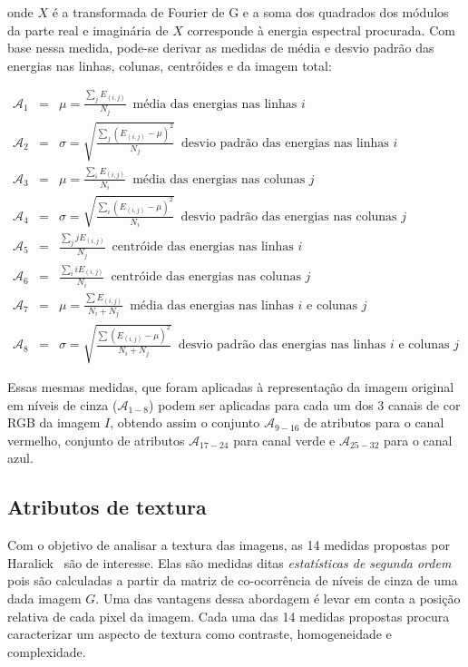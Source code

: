 \noindent onde $X$ é a transformada de Fourier de G e a soma dos quadrados dos
módulos da parte real e imaginária de $X$ corresponde à energia espectral
procurada. Com base nessa medida, pode-se derivar as medidas de média e desvio
padrão das energias nas linhas, colunas, centróides e da imagem total:

\begin{eqnarray}
  \mathcal{A}_1 &=& \mu = \frac{\sum_j E_{(i,j)}}{N_j} \, \, \, \text{média das energias
    nas linhas $i$} \\
  \mathcal{A}_2 &=& \sigma = \sqrt{\frac{\sum_j (E_{(i,j)} - \mu)^2}{N_j}} \, \, \,
  \text{desvio padrão das energias nas linhas $i$} \\
  \mathcal{A}_3 &=& \mu = \frac{\sum_i E_{(i,j)}}{N_i} \, \, \, \text{média das energias
    nas colunas $j$} \\
  \mathcal{A}_4 &=& \sigma = \sqrt{\frac{\sum_i (E_{(i,j)} - \mu)^2}{N_i}} \, \, \,
  \text{desvio padrão das energias nas colunas $j$} \\
  \mathcal{A}_5 &=& \frac{\sum_j j E_{(i,j)}}{N_j} \, \, \, \text{centróide das energias
    nas linhas $i$} \\
  \mathcal{A}_6 &=& \frac{\sum_i i E_{(i,j)}}{N_i} \, \, \, \text{centróide das energias
    nas colunas $j$} \\
  \mathcal{A}_7 &=& \mu = \frac{\sum E_{(i,j)}}{N_i + N_j} \, \, \, \text{média das energias
    nas linhas $i$ e colunas $j$} \\
  \mathcal{A}_8 &=& \sigma = \sqrt{\frac{\sum (E_{(i,j)} - \mu)^2}{N_i + N_j}} \, \, \,
  \text{desvio padrão das energias nas linhas $i$ e colunas $j$}
\end{eqnarray}

Essas mesmas medidas, que foram aplicadas à representação da imagem
original em níveis de cinza ($\mathcal{A}_{1-8}$) podem ser aplicadas
para cada um dos 3 canais de cor RGB da imagem $I$, obtendo assim o
conjunto $\mathcal{A}_{9-16}$ de atributos para o canal vermelho,
conjunto de atributos $\mathcal{A}_{17-24}$ para canal verde e
$\mathcal{A}_{25-32}$ para o canal azul.

\subsection{Atributos de textura}

Com o objetivo de analisar a textura das imagens, as 14 medidas
propostas por Haralick~\cite{haralick} são de interesse. Elas são
medidas ditas \emph{estatísticas de segunda ordem} pois são calculadas
a partir da matriz de co-ocorrência de níveis de cinza de uma dada
imagem $G$. Uma das vantagens dessa abordagem é levar em conta a
posição relativa de cada pixel da imagem. Cada uma das 14 medidas
propostas procura caracterizar um aspecto de textura como contraste,
homogeneidade e complexidade.

